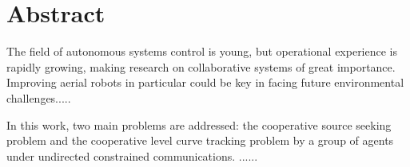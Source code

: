 \thispagestyle{plain}

\chapter*{Abstract}

The field of autonomous systems control is young, but operational experience is rapidly growing, making research on collaborative systems of great importance. Improving aerial robots in particular could be key in facing future environmental challenges.....

 In this work, two main problems are addressed: the cooperative source seeking problem and the cooperative level curve tracking problem by a group of agents under undirected constrained communications. ......